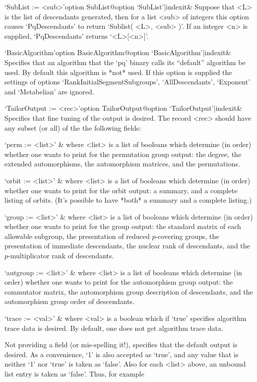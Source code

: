 \>`SubList := <sub>'{option SubList}@{option `SubList'|indexit}&
Suppose that <L> is the list of descendants generated, then  for  a  list
<sub> of integers this option causes `PqDescendants' to return  `Sublist(
<L>, <sub> )'. If an integer <n>  is  supplied,  `PqDescendants'  returns
`<L>[<n>]'.

\>`BasicAlgorithm'{option BasicAlgorithm}@{option `BasicAlgorithm'|indexit}&
Specifies that an algorithm that the `pq' binary  calls  its  ``default''
algorithm be used. By default this  algorithm  is  *not*  used.  If  this
option is supplied the settings of options `RankInitialSegmentSubgroups',
`AllDescendants', `Exponent' and `Metabelian' are ignored.

\>`TailorOutput := <rec>'{option TailorOutput}@{option `TailorOutput'|indexit}&
Specifies that fine tuning of the output is  desired.  The  record  <rec>
should have any subset (or all) of the the following fields:

\quad`perm := <list>' &
where <list> is a list of booleans which determine (in order) whether one
wants to print for the permutation group output: the degree, the extended
automorphisms, the automorphism matrices, and the permutations.

\quad`orbit := <list>' &
where <list> is a list of booleans which determine (in order) whether one
wants to print for the orbit output: a summary, and a complete listing of
orbits. (It's possible to have *both* a summary and a complete listing.)

\quad`group := <list>' &
where <list> is a list of booleans which determine (in order) whether one
wants to print  for  the  group  output:  the  standard  matrix  of  each
allowable subgroup, the presentation of reduced $p$-covering groups,  the
presentation of immediate descendants, the nuclear rank  of  descendants,
and the $p$-multiplicator rank of descendants.

\quad`autgroup := <list>' &
where <list> is a list of booleans which determine (in order) whether one
wants to print for the automorphism group output: the commutator  matrix,
the automorphism group description of descendants, and  the  automorphism
group order of descendants.

\quad`trace := <val>' &
where <val> is a boolean which if `true' specifies algorithm  trace  data
is desired. By default, one does not get algorithm trace data.

Not providing a field (or mis-spelling it!), specifies that  the  default
output is desired. As a convenience, `1' is also accepted as `true',  and
any value that is neither `1' nor `true' is taken as  `false'.  Also  for
each <list> above, an unbound list entry is taken as `false'.  Thus,  for
example

